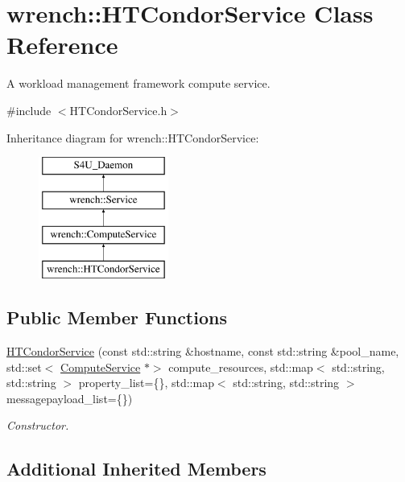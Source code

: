 \hypertarget{classwrench_1_1_h_t_condor_service}{}\section{wrench\+:\+:H\+T\+Condor\+Service Class Reference}
\label{classwrench_1_1_h_t_condor_service}


A workload management framework compute service.  




{\ttfamily \#include $<$H\+T\+Condor\+Service.\+h$>$}

Inheritance diagram for wrench\+:\+:H\+T\+Condor\+Service\+:\begin{figure}[H]
\begin{center}
\leavevmode
\includegraphics[height=4.000000cm]{classwrench_1_1_h_t_condor_service}
\end{center}
\end{figure}
\subsection*{Public Member Functions}
\begin{DoxyCompactItemize}
\item 
\hyperlink{classwrench_1_1_h_t_condor_service_a4632c26bb4c08757ac2ceeb57cd8e2d3}{H\+T\+Condor\+Service} (const std\+::string \&hostname, const std\+::string \&pool\+\_\+name, std\+::set$<$ \hyperlink{classwrench_1_1_compute_service}{Compute\+Service} $\ast$$>$ compute\+\_\+resources, std\+::map$<$ std\+::string, std\+::string $>$ property\+\_\+list=\{\}, std\+::map$<$ std\+::string, std\+::string $>$ messagepayload\+\_\+list=\{\})
\begin{DoxyCompactList}\small\item\em Constructor. \end{DoxyCompactList}\end{DoxyCompactItemize}
\subsection*{Additional Inherited Members}


